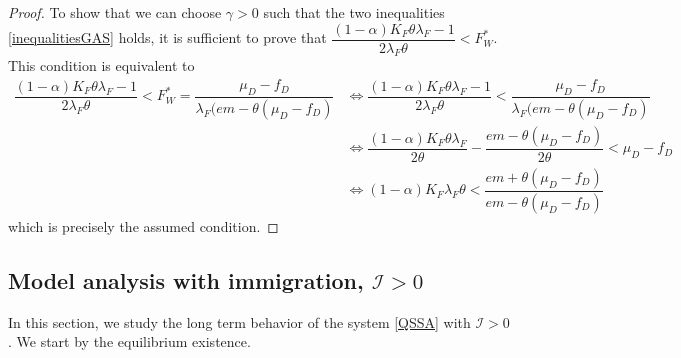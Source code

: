 \documentclass{article}
\newcommand{\lfw}{\lambda_{F}}
\newcommand{\lfw}{\lambda_{F}}
\newcommand{\cI}{\mathcal{I}}
\begin{document}
\begin{proof}
To show that we can choose $\gamma > 0$ such that the two inequalities \eqref{inequalitiesGAS} holds, it is sufficient to prove that $\dfrac{(1-\alpha) K_F \theta \lfw -1}{2 \lfw \theta} < F_W^*$. This condition is equivalent to
\begin{align*}
\dfrac{(1-\alpha) K_F \theta \lfw -1}{2 \lfw \theta} < F_W^* = \dfrac{\mu_D - f_D}{\lfw (em - \theta (\mu_D - f_D)} &\Leftrightarrow \dfrac{(1-\alpha) K_F \theta \lfw -1}{2 \lfw \theta} < \dfrac{\mu_D - f_D}{\lfw (em - \theta (\mu_D - f_D)} \\
&\Leftrightarrow \dfrac{(1-\alpha) K_F \theta \lfw}{2\theta} - \dfrac{em - \theta (\mu_D - f_D)}{2 \theta} < \mu_D - f_D \\
&\Leftrightarrow (1-\alpha) K_F \lfw \theta < \dfrac{em + \theta(\mu_D- f_D)}{em - \theta(\mu_D- f_D)}
\end{align*}
which is precisely the assumed condition.
\end{proof}

\subsection{Model analysis with immigration, $\cI > 0$}

In this section, we study the long term behavior of the system \eqref{QSSA} with $\cI > 0$. We start by the equilibrium existence.
\end{document}
